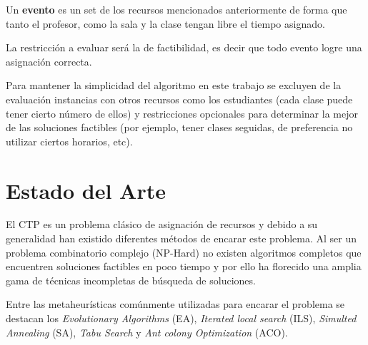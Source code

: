 \documentclass[letter, 10pt]{article}
\renewcommand{\bf}[1]{\textbf{#1}}
\begin{document}
Un \bf{evento} es un set de los recursos mencionados anteriormente de
forma que tanto el profesor, como la sala y la clase tengan libre el tiempo
asignado.

La restricción a evaluar será la de factibilidad, es decir que todo evento logre
una asignación correcta.

Para mantener la simplicidad del algoritmo en este trabajo se excluyen de la
evaluación instancias con otros recursos como los estudiantes (cada clase puede
tener cierto número de ellos) y restricciones opcionales para determinar la
mejor de las soluciones factibles (por ejemplo, tener clases seguidas, de
preferencia no utilizar ciertos horarios, etc).

\section{Estado del Arte}\label{sec:art}

El CTP es un problema clásico de asignación de recursos y debido a su
generalidad han existido diferentes métodos de encarar este problema.
Al ser un problema combinatorio complejo (NP-Hard) no existen algoritmos
completos que encuentren soluciones factibles en poco tiempo y por ello ha
florecido una amplia gama de técnicas incompletas de búsqueda de soluciones.

Entre las metaheurísticas comúnmente utilizadas para encarar el problema se
destacan los \emph{Evolutionary Algorithms} (EA), \emph{Iterated local search}
(ILS), \emph{Simulted Annealing} (SA), \emph{Tabu Search} y \emph{Ant colony
Optimization} (ACO).
\end{document}
